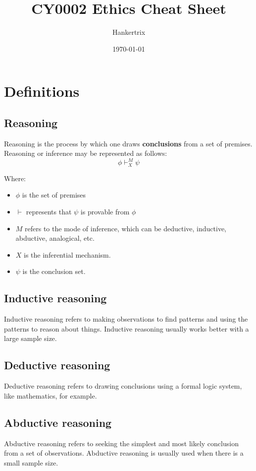 \documentclass[11pt]{article}
\author{Hankertrix}
\date{\today}
\title{CY0002 Ethics Cheat Sheet}
\begin{document}
\maketitle
\setcounter{tocdepth}{2}
\tableofcontents \clearpage\section{Definitions}
\label{sec:org803b679}

\subsection{Reasoning}
\label{sec:org1c23cb1}
Reasoning is the process by which one draws \textbf{conclusions} from a set of premises. Reasoning or inference may be represented as follows:
\[\phi \vdash^M_X \psi\]

Where:
\begin{itemize}
\item \(\phi\) is the set of premises
\item \(\vdash\) represents that \(\psi\) is provable from \(\phi\)
\item \(M\) refers to the mode of inference, which can be deductive, inductive, abductive, analogical, etc.
\item \(X\) is the inferential mechanism.
\item \(\psi\) is the conclusion set.
\end{itemize}
\subsection{Inductive reasoning}
\label{sec:org6cd6cfe}
Inductive reasoning refers to making observations to find patterns and using the patterns to reason about things. Inductive reasoning usually works better with a large sample size.
\subsection{Deductive reasoning}
\label{sec:org01c7fb0}
Deductive reasoning refers to drawing conclusions using a formal logic system, like mathematics, for example.
\subsection{Abductive reasoning}
\label{sec:orga0be1b5}
Abductive reasoning refers to seeking the simplest and most likely conclusion from a set of observations. Abductive reasoning is usually used when there is a small sample size.
\end{document}
